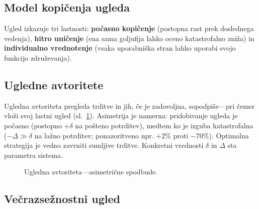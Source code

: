 \documentclass[11pt,a4paper,twocolumn]{article}
\begin{document}
\subsection{Model kopičenja ugleda}

Ugled izkazuje tri lastnosti: \textbf{počasno kopičenje} (postopna rast prek doslednega vedenja), \textbf{hitro uničenje} (ena sama goljufija lahko oceno katastrofalno zniža) in \textbf{individualno vrednotenje} (vsaka uporabniška stran lahko uporabi svojo funkcijo združevanja).

\subsection{Ugledne avtoritete}

Ugledna avtoriteta pregleda trditve in jih, če je zadovoljna, sopodpiše---pri čemer vloži svoj lastni ugled (sl.~\ref{fig:authority}). Asimetrija je namerna: pridobivanje ugleda je počasno (postopno $+\delta$ na pošteno potrditev), medtem ko je izguba katastrofalna ($-\Delta \gg \delta$ na lažno potrditev; ponazoritveno npr. $+2\%$ proti $-70\%$). Optimalna strategija je vedno zavrniti sumljive trditve. Konkretni vrednosti $\delta$ in $\Delta$ sta parametra sistema.

\begin{figure}[ht]
\centering
{}
\caption{Ugledna avtoriteta---asimetrične spodbude.}
\label{fig:authority}
\end{figure}

\subsection{Večrazsežnostni ugled}
\end{document}
